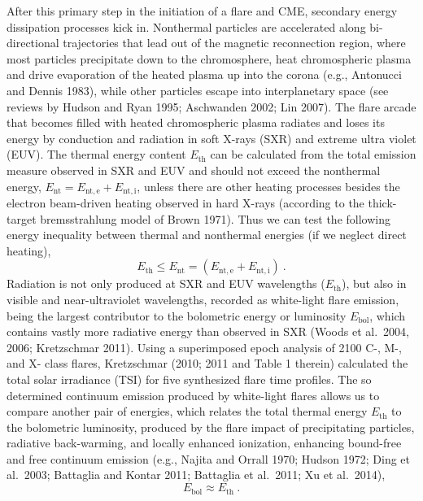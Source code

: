 \documentclass[10pt,preprint]{aastex}  %
\begin{document}
After this primary step in the initiation of a flare and CME,
secondary energy dissipation processes kick in. Nonthermal particles
are accelerated along bi-directional trajectories that lead out of 
the magnetic reconnection region, where most particles precipitate
down to the chromosphere, heat chromospheric plasma and
drive evaporation of the heated plasma up into the corona
(e.g., Antonucci and Dennis 1983),
while other particles escape into interplanetary
space (see reviews by Hudson and Ryan 1995; Aschwanden 2002; Lin 2007). 
The flare arcade that becomes filled with heated 
chromospheric plasma radiates and loses its energy by conduction 
and radiation in soft X-rays (SXR) and extreme ultra violet (EUV). 
The thermal energy
content $E_{\mathrm{th}}$ can be calculated from the total emission measure
observed in SXR and EUV and should not exceed the nonthermal
energy, $E_{\mathrm{nt}} = E_{\mathrm{nt,e}} + E_{\mathrm{nt,i}}$,
unless there are other heating processes besides the electron beam-driven
heating observed in hard X-rays (according to the thick-target 
bremsstrahlung model of Brown 1971). Thus we can test the following energy 
inequality between thermal and nonthermal energies (if we neglect direct
heating),
\begin{equation}
	E_{\mathrm{th}} \le E_{\mathrm{nt}} 
	= ( E_{\mathrm{nt,e}} + E_{\mathrm{nt,i}} ) \ .
\end{equation}
Radiation is not only produced at SXR and EUV wavelengths ($E_{\mathrm{th}}$), 
but also in visible and near-ultraviolet wavelengths, recorded 
as white-light flare emission, being the largest contributor to the 
bolometric energy or luminosity 
$E_{\mathrm{bol}}$, which contains vastly more radiative energy 
than observed in SXR (Woods et al.~2004, 2006; Kretzschmar 2011). 
Using a superimposed epoch analysis of 2100 C-, M-, and X- class flares, 
Kretzschmar (2010; 2011 and Table 1 therein) calculated the total solar 
irradiance (TSI) for five synthesized flare time profiles. 
The so determined
continuum emission produced by white-light flares allows us 
to compare another pair of energies, which relates the total
thermal energy $E_{\mathrm{th}}$ to the bolometric luminosity, 
produced by the flare impact of precipitating particles, 
radiative back-warming, and locally enhanced ionization, enhancing
bound-free and free continuum emission (e.g., 
Najita and Orrall 1970; Hudson 1972; Ding et al.~2003;
Battaglia and Kontar 2011; Battaglia et al.~2011; Xu et al.~2014),
\begin{equation}
	E_{\mathrm{bol}} \approx E_{\mathrm{th}} \ .
\end{equation}
\end{document}

